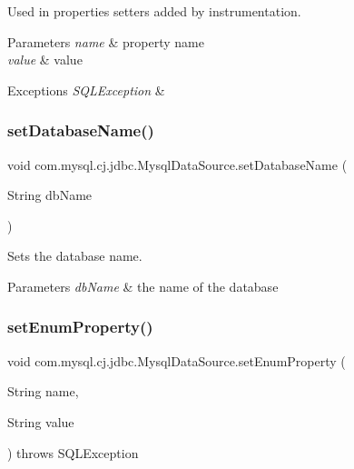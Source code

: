 Used in properties setters added by instrumentation.


\begin{DoxyParams}{Parameters}
{\em name} & property name \\
\hline
{\em value} & value \\
\hline
\end{DoxyParams}

\begin{DoxyExceptions}{Exceptions}
{\em S\+Q\+L\+Exception} & \\
\hline
\end{DoxyExceptions}
\mbox{\label{classcom_1_1mysql_1_1cj_1_1jdbc_1_1_mysql_data_source_a61c38c590ddffdefc2eca544a68beb09}} 
\subsubsection{\texorpdfstring{set\+Database\+Name()}{setDatabaseName()}}
{\footnotesize\ttfamily void com.\+mysql.\+cj.\+jdbc.\+Mysql\+Data\+Source.\+set\+Database\+Name (\begin{DoxyParamCaption}\item[{String}]{db\+Name }\end{DoxyParamCaption})}

Sets the database name.


\begin{DoxyParams}{Parameters}
{\em db\+Name} & the name of the database \\
\hline
\end{DoxyParams}
\mbox{\label{classcom_1_1mysql_1_1cj_1_1jdbc_1_1_mysql_data_source_a41b6d09a1910df978d413640730523a9}} 
\subsubsection{\texorpdfstring{set\+Enum\+Property()}{setEnumProperty()}}
{\footnotesize\ttfamily void com.\+mysql.\+cj.\+jdbc.\+Mysql\+Data\+Source.\+set\+Enum\+Property (\begin{DoxyParamCaption}\item[{String}]{name,  }\item[{String}]{value }\end{DoxyParamCaption}) throws S\+Q\+L\+Exception\hspace{0.3cm}{\ttfamily [protected]}}

